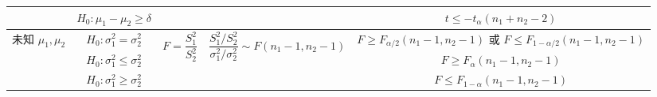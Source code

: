 \begin{table}[H]
{\begin{tabular}{ccccc}
                                                          & $H_0:\mu_1-\mu_2\geqslant \delta$    &                                                                                                                   &                                                                                  & $t\leqslant -t_{\alpha}(n_1+n_2-2)$                   \\
            \midrule
            \multirow{3}{*}{未知 $\mu_1,\mu_2$}           & $H_0:\sigma_1^2=\sigma_2^2$          & \multirow{3}{*}{$F=\dfrac{S_1^2}{S_2^2}$}                                                                         & \multirow{3}{*}{$\dfrac{S_1^2/S_2^2}{\sigma_1^2/\sigma_2^2}\sim F(n_1-1,n_2-1)$} & \makecell[c]{$F\geqslant F_{\alpha/2}(n_1-1,n_2-1)$ 或\\ $F\leqslant F_{1-\alpha/2}(n_1-1,n_2-1)$}                \\
                                                          & $H_0:\sigma_1^2\leqslant \sigma_2^2$ &                                                                                                                   &                                                                                  & $F\geqslant F_\alpha(n_1-1,n_2-1)$                    \\
                                                          & $H_0:\sigma_1^2\geqslant \sigma_2^2$ &                                                                                                                   &                                                                                  & $F\leqslant F_{1-\alpha}(n_1-1,n_2-1)$
        \end{tabular}}
\end{table}

